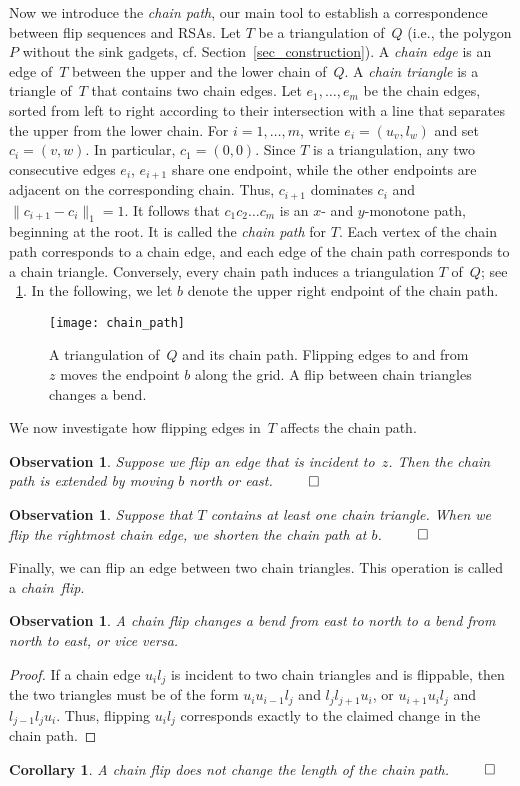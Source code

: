 \documentclass[a4paper,11pt]{article}
\newtheorem{corollary}[theorem]{Corollary}
\newtheorem{observation}[theorem]{Observation}
\newcommand{\noproof}{~\hfill$\qed$}
\newcommand{\qedopt}{}
\newcommand{\ShoLong}[2]{#2}
\begin{document}
Now we introduce the \emph{chain path}, our main tool to
establish a correspondence between flip sequences and RSAs.
Let $T$ be a triangulation of~$Q$ (i.e., the polygon $P$ 
without the sink gadgets, cf. Section~\ref{sec_construction}).
A \emph{chain edge} is an edge of~$T$ between the upper and the lower 
chain of~$Q$. 
A \emph{chain triangle} is a triangle of~$T$ that contains two chain edges.
Let $e_1, \dots, e_m$ be the chain edges, sorted from left to 
right according to their intersection with a line
that separates the upper from the lower chain.
For $i = 1, \dots, m$, write $e_i = (u_v, l_w)$ and set $c_i = (v,w)$.
In particular, $c_1 = (0,0)$.
Since $T$ is a triangulation, any two consecutive edges $e_i$, $e_{i+1}$ share one endpoint, while the other endpoints are adjacent on the corresponding chain.
Thus, $c_{i+1}$ dominates $c_i$ and $\|c_{i+1}-c_i\|_1 = 1$.
It follows that $c_1c_2\dots c_m$ is an $x$- and $y$-monotone path, 
beginning at the root.
It is called the \emph{chain path} for $T$.
Each vertex of the chain path corresponds to a chain edge, and each 
edge of the chain path corresponds to a chain triangle. Conversely,
every chain path induces a triangulation $T$ of~$Q$;
see \figurename~\ref{fig_chain_path}.
In the following, we let $b$ denote the upper right endpoint of the 
chain path.
\begin{figure}
\centering
\texttt{[image: chain\_path]}
\caption{A triangulation of~$Q$ and its
chain path. Flipping edges to and from $z$ moves the endpoint $b$ along
the grid.
A flip between chain triangles changes a bend. 
}
\label{fig_chain_path}
\end{figure}
\ShoLong{}{We now investigate how flipping edges in~$T$ affects the chain path.

\begin{observation}\label{obs_chain_path_monotone}
Suppose we flip an edge that is incident to~$z$.
Then the chain path is extended by moving $b$ north or east.\noproof
\end{observation}

\begin{observation}
Suppose that $T$ contains at least one chain triangle.
When we flip the rightmost chain edge, we shorten the chain path at $b$.\noproof
\end{observation}

Finally, we can flip an edge between two chain triangles.
This operation is called a \emph{chain~flip}.

\begin{observation}\label{lem_bend_chain_flip}
A chain flip changes a bend from east to north to a bend from north to east, or vice versa.
\end{observation}
\begin{proof}
If a chain edge $u_il_j$ is incident to two chain triangles and is flippable, then the two triangles must be of the form $u_i u_{i-1} l_j$ and
$l_j l_{j+1} u_i$, or $u_{i+1} u_i l_j$ and $l_{j-1} l_j u_i$.
Thus, flipping $u_il_j$ corresponds exactly to the claimed change in the chain path.
\qedopt
\end{proof}
}\ShoLong{}{\begin{corollary}
A chain flip does not change the length of the chain path.\noproof
\end{corollary}
}
\end{document}
